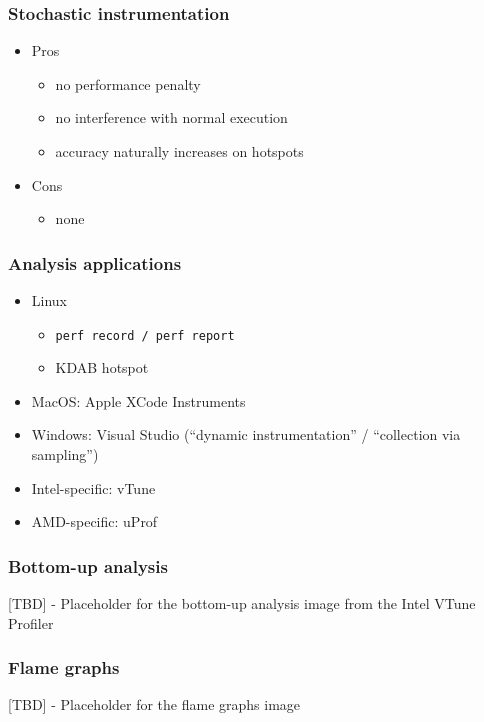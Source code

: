 \documentclass[12pt]{article}
\begin{document}
\subsubsection{Stochastic instrumentation}
\begin{itemize}
    \item Pros
    \begin{itemize}
        \item no performance penalty
        \item no interference with normal execution
        \item accuracy naturally increases on hotspots
    \end{itemize}
    \item Cons
    \begin{itemize}
        \item none
    \end{itemize}
\end{itemize}

\subsubsection{Analysis applications}

\begin{itemize}
  \item Linux
  \begin{itemize}
    \item \texttt{perf record / perf report}
    \item KDAB hotspot
  \end{itemize}
  \item MacOS: Apple XCode Instruments
  \item Windows: Visual Studio (``dynamic instrumentation'' / ``collection via sampling'')
  \item Intel-specific: vTune
  \item AMD-specific: uProf
\end{itemize}

\subsubsection{Bottom-up analysis}
[TBD] - Placeholder for the bottom-up analysis image from the Intel VTune Profiler

\subsubsection{Flame graphs}
[TBD] - Placeholder for the flame graphs image
\end{document}
